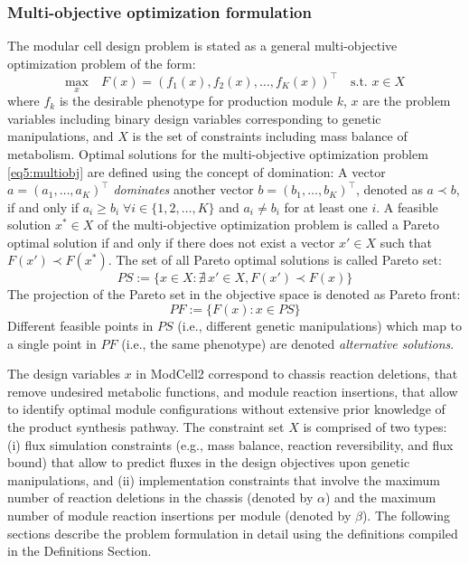 \subsubsection{Multi-objective optimization formulation}
The modular cell design problem is stated as a general multi-objective optimization problem of the form:
\begin{equation}
\underset{x}{\text{max}} \quad  F(x) = (f_{1}(x), f_{2}(x), \ldots, f_K (x))^\top  \quad  \text{s.t. } x \in X \label{eq5:multiobj}
\end{equation}
\noindent where $f_k$ is the desirable phenotype for production module $k$, $x$ are the problem variables including binary design variables corresponding to genetic manipulations, and $X$ is the set of constraints including mass balance of metabolism. Optimal solutions for the multi-objective optimization problem \eqref{eq5:multiobj} are defined using the concept of domination: A vector $a=(a_1,\dots,a_K)^\top$ \textit{dominates} another vector $b=(b_1,\dots ,b_K)^\top$, denoted as  $a\prec b$, if and only if $a_i\ge b_i \; \forall i\in\{1,2,\dots,K\}$ and $a_i\ne b_i$ for at least one $i$. A feasible solution $x^* \in X$ of the multi-objective optimization problem is called a Pareto optimal solution if and only if  there does not exist a vector $x'\in X$ such that $F(x')\prec F(x^*)$. The set of all Pareto optimal solutions is called Pareto set:
\begin{equation}
\mathit{PS}:=\{x \in X:\nexists \, x' \in X, F(x') \prec F(x)\}
\end{equation}
The projection of the Pareto set in the objective space is denoted as Pareto front:
\begin{equation}
\mathit{PF}:=\{F(x): x \in PS \}
\end{equation}
Different feasible points in $\mathit{PS}$ (i.e., different genetic manipulations) which map to a single point in $\mathit{PF}$ (i.e., the same phenotype) are denoted \textit{alternative solutions}.

The design variables $x$ in ModCell2 correspond to chassis reaction deletions, that remove undesired metabolic functions,  and module reaction insertions, that allow to identify optimal module configurations without extensive prior knowledge of the product synthesis pathway.  The constraint set $X$ is comprised of two types: (i) flux simulation constraints (e.g., mass balance,  reaction reversibility, and flux bound) that allow to predict fluxes in the design objectives upon genetic manipulations, and (ii) implementation constraints that involve the maximum number of reaction deletions in the chassis (denoted by $\alpha$) and the maximum number of module reaction insertions per module (denoted by $\beta$). The following sections describe the problem formulation in detail using the definitions compiled in the Definitions Section.

